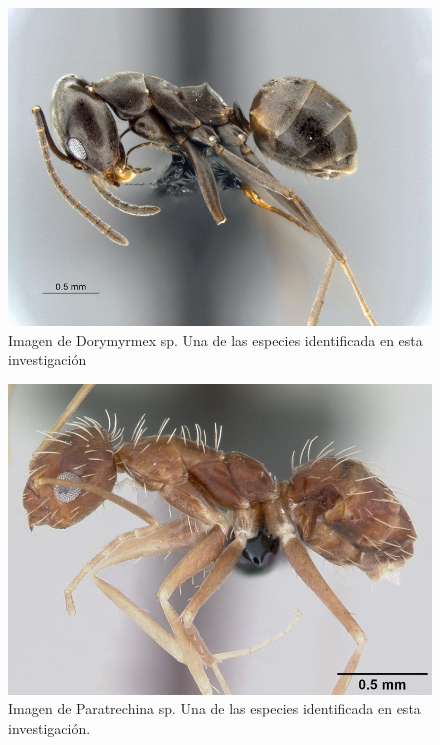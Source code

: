 \documentclass[11pt,]{article}
\begin{document}
\begin{figure}
\centering
\includegraphics{dorymyrmex.jpg}
\caption{Imagen de Dorymyrmex sp. Una de las especies identificada en
esta investigación}
\end{figure}

\begin{figure}
\centering
\includegraphics{paratrechina.jpg}
\caption{Imagen de Paratrechina sp. Una de las especies identificada en
esta investigación.}
\end{figure}
\end{document}
